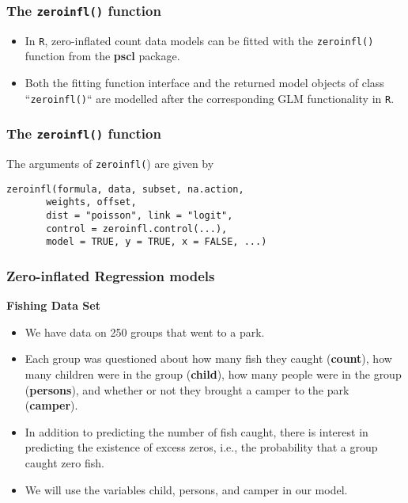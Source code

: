 \documentclass[MASTER.tex]{subfiles}
\begin{document}
\begin{frame}
\frametitle{The \texttt{zeroinfl()} function}
\large
\begin{itemize}
\item In \texttt{R}, zero-inflated count data models can be fitted with the \texttt{zeroinfl()} function from the
\textbf{pscl} package. 
\item Both the fitting function interface and the returned model objects of class
``\texttt{zeroinfl()}`` are  modelled
after the corresponding GLM functionality in \texttt{R}. 
\end{itemize}

\end{frame}
\begin{frame}[fragile]
\frametitle{The \texttt{zeroinfl()} function}

	The arguments of \texttt{zeroinfl(}) are given
	by
\begin{framed}
\begin{verbatim}
zeroinfl(formula, data, subset, na.action, 
       weights, offset,
       dist = "poisson", link = "logit", 
       control = zeroinfl.control(...),
       model = TRUE, y = TRUE, x = FALSE, ...)
\end{verbatim}
\end{framed}

\end{frame}

\begin{frame}[fragile]
	\frametitle{Zero-inflated Regression models}
	\textbf{Fishing Data Set}
	\begin{itemize}
		\item We have data on 250 groups that went to a park. 
		\item Each group was questioned about how many fish they caught (\textbf{count}), how many children were in the group (\textbf{child}), how many people were in the group (\textbf{persons}), and whether or not they brought a camper to the park (\textbf{camper}).
		\item 
		In addition to predicting the number of fish caught, there is interest in predicting the existence of excess zeros, i.e., the probability that a group caught zero fish. 
		\item We will use the variables child, persons, and camper in our model. 
	\end{itemize}
\end{frame}
\end{document}
